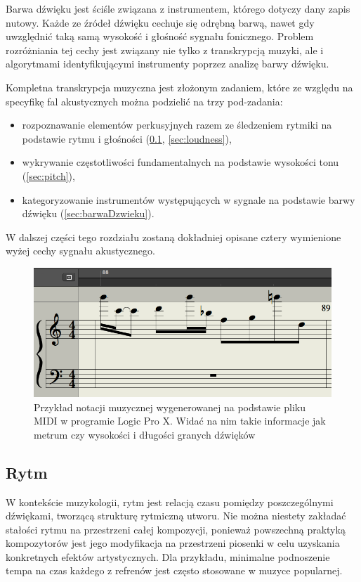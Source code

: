 \documentclass[12pt,a4paper,twoside]{mwart}
\begin{document}
Barwa dźwięku jest ściśle związana z instrumentem, którego dotyczy dany zapis nutowy. Każde ze źródeł dźwięku cechuje się odrębną barwą, nawet gdy uwzględnić taką samą wysokość i głośność sygnału fonicznego. Problem rozróżniania tej cechy jest związany nie tylko z transkrypcją muzyki, ale i algorytmami identyfikującymi instrumenty poprzez analizę barwy dźwięku.

Kompletna transkrypcja muzyczna jest złożonym zadaniem, które ze względu na specyfikę fal akustycznych można podzielić na trzy pod-zadania:
\begin{itemize}
  \item rozpoznawanie elementów perkusyjnych razem ze śledzeniem rytmiki na podstawie rytmu i głośności (\ref{sec:rytm}, \ref{sec:loudness}),
  \item wykrywanie częstotliwości fundamentalnych na podstawie wysokości tonu (\ref{sec:pitch}),
  \item  kategoryzowanie instrumentów występujących w sygnale na podstawie barwy dźwięku (\ref{sec:barwaDzwieku}).
\end{itemize}
W dalszej części tego rozdziału zostaną dokładniej opisane cztery wymienione wyżej cechy sygnału akustycznego.

\begin{figure}[h]
  \begin{center}
    \includegraphics[scale=0.5]{images/pieciolinia_logic.png}
    \caption{Przykład notacji muzycznej wygenerowanej na podstawie pliku MIDI w programie Logic Pro X. Widać na nim takie informacje jak metrum czy wysokości i długości granych dźwięków}
  \end{center}
\end{figure}

\subsection{Rytm} \label{sec:rytm}
W kontekście muzykologii, rytm jest relacją czasu pomiędzy poszczególnymi dźwiękami, tworzącą strukturę rytmiczną utworu. Nie można niestety zakładać stałości rytmu na przestrzeni całej kompozycji, ponieważ powszechną praktyką kompozytorów jest jego modyfikacja na przestrzeni piosenki w celu uzyskania konkretnych efektów artystycznych. Dla przykładu, minimalne podnoszenie tempa na czas każdego z refrenów jest często stosowane w muzyce popularnej.
\end{document}
